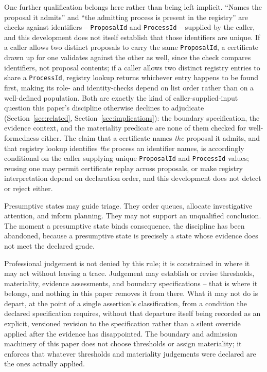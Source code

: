 \documentclass[smallcondensed,envcountsect,natbib]{svjour3}
\begin{document}
One further qualification belongs here rather than being left implicit. ``Names the proposal it admits'' and ``the admitting process is present in the registry'' are checks against identifiers -- \texttt{ProposalId} and \texttt{ProcessId} -- supplied by the caller, and this development does not itself establish that those identifiers are unique. If a caller allows two distinct proposals to carry the same \texttt{ProposalId}, a certificate drawn up for one validates against the other as well, since the check compares identifiers, not proposal contents; if a caller allows two distinct registry entries to share a \texttt{ProcessId}, registry lookup returns whichever entry happens to be found first, making its role- and identity-checks depend on list order rather than on a well-defined population. Both are exactly the kind of caller-supplied-input question this paper's discipline otherwise declines to adjudicate (Section~\ref{sec:related}, Section~\ref{sec:implications}): the boundary specification, the evidence context, and the materiality predicate are none of them checked for well-formedness either. The claim that a certificate names \emph{the} proposal it admits, and that registry lookup identifies \emph{the} process an identifier names, is accordingly conditional on the caller supplying unique \texttt{ProposalId} and \texttt{ProcessId} values; reusing one may permit certificate replay across proposals, or make registry interpretation depend on declaration order, and this development does not detect or reject either.

Presumptive states may guide triage. They order queues, allocate investigative attention, and inform planning. They may not support an unqualified conclusion. The moment a presumptive state binds consequence, the discipline has been abandoned, because a presumptive state is precisely a state whose evidence does not meet the declared grade.

Professional judgement is not denied by this rule; it is constrained in where it may act without leaving a trace. Judgement may establish or revise thresholds, materiality, evidence assessments, and boundary specifications -- that is where it belongs, and nothing in this paper removes it from there. What it may not do is depart, at the point of a single assertion's classification, from a condition the declared specification requires, without that departure itself being recorded as an explicit, versioned revision to the specification rather than a silent override applied after the evidence has disappointed. The boundary and admission machinery of this paper does not choose thresholds or assign materiality; it enforces that whatever thresholds and materiality judgements were declared are the ones actually applied.
\end{document}
